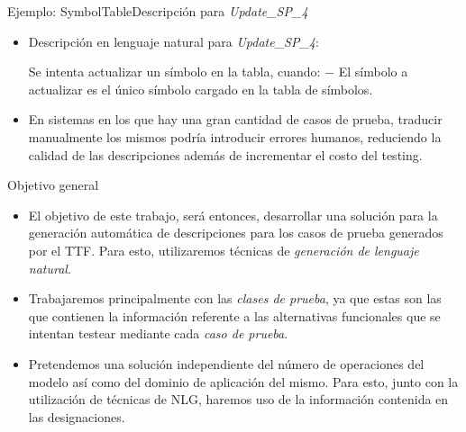 \documentclass{beamer}
\begin{document}
      \begin{frame}{Ejemplo: SymbolTable}{Descripción para \emph{Update\_SP\_4}}
                        													
        \begin{itemize}
          \item{
            Descripción en lenguaje natural para \emph{Update\_SP\_4}:\\
            \begin{exampleblock}{Se intenta actualizar un símbolo en la tabla, cuando:}
              $-$ El símbolo a actualizar es el único símbolo cargado en la tabla de símbolos.
            \end{exampleblock}
          }
          \item En sistemas en los que hay una gran cantidad de casos de prueba, traducir manualmente los mismos podría introducir errores humanos, reduciendo la calidad de las descripciones además de incrementar el costo del testing.
        \end{itemize}
      \end{frame}
                  										
      \begin{frame}{Objetivo general}{}
        \begin{itemize}
          \item El objetivo de este trabajo, será entonces, desarrollar una solución para la generación automática de descripciones para los casos de prueba generados por el TTF. Para esto, utilizaremos técnicas de \emph{generación de lenguaje natural}.
          \item Trabajaremos principalmente con las \emph{clases de prueba}, ya que estas son las que contienen la información referente a las alternativas funcionales que se intentan testear mediante cada \emph{caso de prueba}.
          \item Pretendemos una solución independiente del número de operaciones del modelo así como del dominio de aplicación del mismo. Para esto, junto con la utilización de técnicas de NLG, haremos uso de la información contenida en las designaciones.
        \end{itemize}
      \end{frame}
                  										
\end{document}
